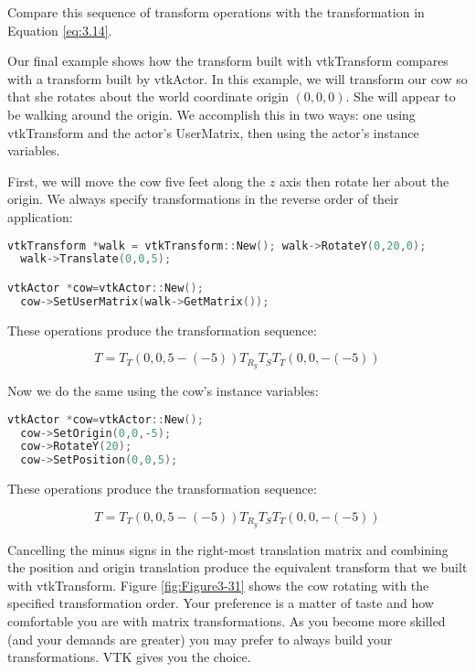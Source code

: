 Compare this sequence of transform operations with the transformation in Equation \eqref{eq:3.14}.

Our final example shows how the transform built with vtkTransform compares with a transform built by vtkActor. In this example, we will transform our cow so that she rotates about the world coordinate origin $(0,0,0)$. She will appear to be walking around the origin. We accomplish this in two ways: one using vtkTransform and the actor's UserMatrix, then using the actor's instance variables.

First, we will move the cow five feet along the $z$ axis then rotate her about the origin. We always specify transformations in the reverse order of their application:

\begin{lstlisting}[language=C++, caption={}]
vtkTransform *walk = vtkTransform::New(); walk->RotateY(0,20,0);
  walk->Translate(0,0,5);

vtkActor *cow=vtkActor::New();
  cow->SetUserMatrix(walk->GetMatrix());
\end{lstlisting}

These operations produce the transformation sequence:

\begin{equation}\label{eq:3.15}
T=T_T(0,0,5-(-5))T_{R_y}T_ST_T(0,0,-(-5))
\end{equation}

Now we do the same using the cow's instance variables:

\begin{lstlisting}[language=C++, caption={}]
vtkActor *cow=vtkActor::New();
  cow->SetOrigin(0,0,-5);
  cow->RotateY(20);
  cow->SetPosition(0,0,5);
\end{lstlisting}

These operations produce the transformation sequence:

\begin{equation}\label{eq:3.16}
T=T_T(0,0,5-(-5))T_{R_y}T_ST_T(0,0,-(-5))
\end{equation}

Cancelling the minus signs in the right-most translation matrix and combining the position and origin translation produce the equivalent transform that we built with vtkTransform. Figure \ref{fig:Figure3-31} shows the cow rotating with the specified transformation order. Your preference is a matter of taste and how comfortable you are with matrix transformations. As you become more skilled (and your demands are greater) you may prefer to always build your transformations. VTK gives you the choice.

